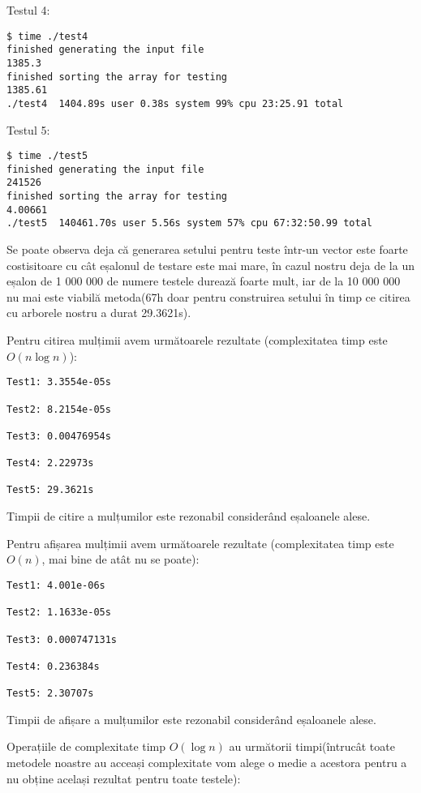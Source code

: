 \documentclass[]{report}
\begin{document}
	Testul 4:
	\begin{lstlisting}
$ time ./test4
finished generating the input file
1385.3
finished sorting the array for testing
1385.61
./test4  1404.89s user 0.38s system 99% cpu 23:25.91 total
	\end{lstlisting}

	Testul 5:
	\begin{lstlisting}
$ time ./test5
finished generating the input file
241526
finished sorting the array for testing
4.00661
./test5  140461.70s user 5.56s system 57% cpu 67:32:50.99 total
	\end{lstlisting}

	Se poate observa deja că generarea setului pentru teste într-un vector
	este foarte costisitoare cu cât eșalonul de testare este mai mare, în cazul
	nostru deja de la un eșalon de 1 000 000 de numere testele durează foarte 
	mult, iar de la 10 000 000 nu mai este viabilă metoda(67h doar pentru 
	construirea setului în timp ce citirea cu arborele nostru a durat 29.3621s). 

	Pentru citirea mulțimii avem următoarele rezultate (complexitatea timp
	este $O(n\log n)$):

	\begin{lstlisting}
Test1: 3.3554e-05s

Test2: 8.2154e-05s

Test3: 0.00476954s

Test4: 2.22973s

Test5: 29.3621s
	\end{lstlisting}

	Timpii de citire a mulțumilor este rezonabil considerând eșaloanele alese.

	Pentru afișarea mulțimii avem următoarele rezultate (complexitatea timp
	este $O(n)$, mai bine de atât nu se poate):

	\begin{lstlisting}
Test1: 4.001e-06s

Test2: 1.1633e-05s

Test3: 0.000747131s

Test4: 0.236384s

Test5: 2.30707s
	\end{lstlisting}

	Timpii de afișare a mulțumilor este rezonabil considerând eșaloanele alese.

	Operațiile de complexitate timp $O(\log n)$ au următorii timpi(întrucât
	toate metodele noastre au acceași complexitate vom alege o medie a acestora
	pentru a nu obține același rezultat pentru toate testele):
\end{document}
